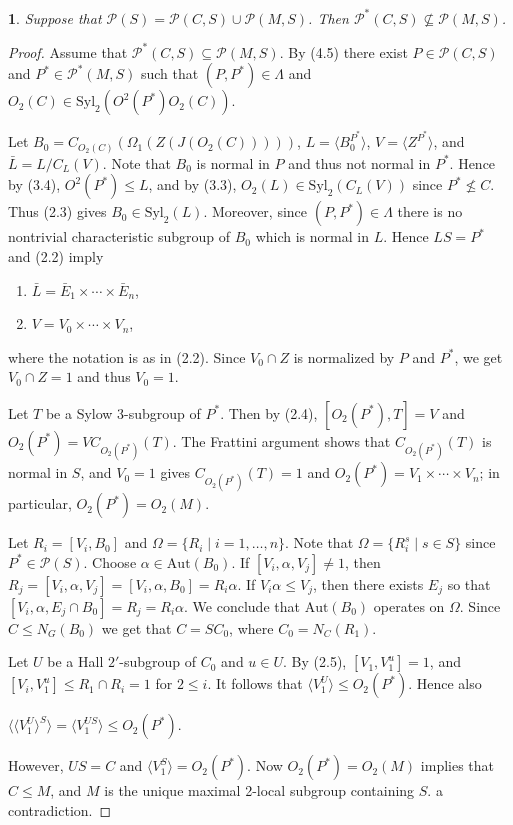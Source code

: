\documentclass[11pt]{article}
\theoremstyle{plain}
\theoremstyle{stmplain}
\newtheorem{stm}{}[section]
\newcommand{\disp}[1]{\begin{center}$\displaystyle #1$\end{center}}
\begin{document}
\begin{stm}\label{st:4.6}
Suppose that $\mathcal{P}(S) = \mathcal{P}(C, S) \cup \mathcal{P}(M, S)$. Then
$\mathcal{P}^*(C, S) \nsubseteq \mathcal{P}(M, S)$.
\end{stm}

\begin{proof}
Assume that $\mathcal{P}^*(C, S) \subseteq \mathcal{P}(M, S)$. By (4.5) there
exist $P \in \mathcal{P}(C, S)$ and $P^* \in \mathcal{P}^*(M, S)$ such that
$(P, P^*) \in \Lambda$ and $O_2(C) \in \mathrm{Syl}_2(O^2(P^*)O_2(C))$.

\smallskip
\noindent Let $B_0 = C_{O_2(C)}(\Omega_1(Z(J(O_2(C)))))$, $L = \langle B_0^{P^*} \rangle$,
$V = \langle Z^{P^*} \rangle$, and $\bar{L} = L/C_L(V)$. Note that $B_0$ is
normal in $P$ and thus not normal in $P^*$. Hence by (3.4), $O^2(P^*) \le L$,
and by (3.3), $O_2(L) \in \mathrm{Syl}_2(C_L(V))$ since $P^* \nleq C$. Thus
(2.3) gives $B_0 \in \mathrm{Syl}_2(L)$. Moreover, since $(P, P^*) \in \Lambda$
there is no nontrivial characteristic subgroup of $B_0$ which is normal in $L$.
Hence $LS = P^*$ and (2.2) imply
\begin{enumerate}
\item[(i)] $\bar{L} = \bar{E}_1 \times \cdots \times \bar{E}_n$,
\item[(ii)] $V = V_0 \times \cdots \times V_n$,
\end{enumerate}
where the notation is as in (2.2). Since $V_0 \cap Z$ is normalized by $P$ and
$P^*$, we get $V_0 \cap Z = 1$ and thus $V_0 = 1$.

\smallskip
\noindent Let $T$ be a Sylow 3-subgroup of $P^*$. Then by (2.4), $[O_2(P^*), T] = V$
and $O_2(P^*) = VC_{O_2(P^*)}(T)$. The Frattini argument shows that
$C_{O_2(P^*)}(T)$ is normal in $S$, and $V_0 = 1$ gives $C_{O_2(P^*)}(T) = 1$
and $O_2(P^*) = V_1 \times \cdots \times V_n$; in particular, $O_2(P^*) =
O_2(M)$.

\smallskip
\noindent Let $R_i = [V_i, B_0]$ and $\Omega = \{R_i \mid i = 1, \ldots, n\}$. Note
that $\Omega = \{R_i^s \mid s \in S\}$ since $P^* \in \mathcal{P}(S)$. Choose
$\alpha \in \mathrm{Aut}(B_0)$. If $[V_i, \alpha, V_j] \ne 1$, then $R_j =
[V_i, \alpha, V_j] = [V_i, \alpha, B_0] = R_i\alpha$. If $V_i\alpha \le V_j$,
then there exists $E_j$ so that $[V_i, \alpha, E_j \cap B_0] = R_j = R_i\alpha$.
We conclude that $\mathrm{Aut}(B_0)$ operates on $\Omega$. Since $C \le
N_G(B_0)$ we get that $C = SC_0$, where $C_0 = N_C(R_1)$.

\smallskip
\noindent Let $U$ be a Hall $2'$-subgroup of $C_0$ and $u \in U$. By (2.5),
$[V_1, V_1^u] = 1$, and $[V_i, V_1^u] \le R_1 \cap R_i = 1$ for $2 \le i$. It
follows that $\langle V_1^U \rangle \le O_2(P^*)$. Hence also
\disp{\langle \langle V_1^U \rangle^S \rangle = \langle V_1^{US} \rangle \le O_2(P^*).}
However, $US = C$ and $\langle V_1^S \rangle = O_2(P^*)$. Now $O_2(P^*) = O_2(M)$
implies that $C \le M$, and $M$ is the unique maximal 2-local subgroup
containing $S$. a contradiction.
\end{proof}
\end{document}
